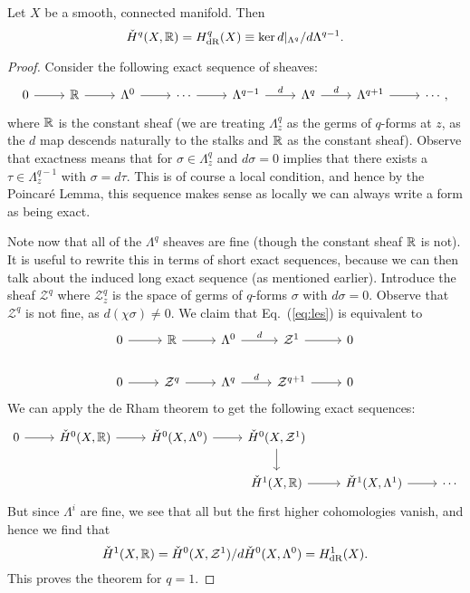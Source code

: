 \documentclass{../mathnotes}
\begin{document}
\begin{thm}[de Rham]
    Let $X$ be a smooth, connected manifold. Then
    \[\check H^q(X,\mathbb{R})=H_{\rm dR}^q(X)\equiv\ker d|_{\Lambda^q}/d\Lambda^{q-1}.\]
\end{thm}

\begin{proof}
    Consider the following exact sequence of sheaves:
    \begin{equation}
        \label{eq:les}
        \begin{tikzcd}
            0\arrow{r}&\R\arrow{r}&\Lambda^0\arrow{r}&\cdots\arrow{r}&\Lambda^{q-1}\arrow{r}{d}&\Lambda^q\arrow{r}{d}&\Lambda^{q+1}\arrow{r}&\cdots,
        \end{tikzcd}
    \end{equation}
    where $\mathbb{R}$ is the constant sheaf (we are treating $\Lambda_z^q$ as the germs of $q$-forms at $z$, as the $d$ map descends naturally
    to the stalks and $\mathbb{R}$ as the constant sheaf). Observe that exactness means that for $\sigma\in\Lambda_z^q$ and $d\sigma=0$
    implies that there exists a $\tau\in\Lambda_z^{q-1}$ with $\sigma=d\tau$. This is of course a local condition, and hence by
    the Poincar\'e Lemma, this sequence makes sense as locally we can always write a form as being exact.

    Note now that
    all of the $\Lambda^q$ sheaves are fine (though the constant sheaf $\mathbb{R}$ is not). It is useful to rewrite this in terms
    of short exact sequences, because we can then talk about the induced long exact sequence (as mentioned earlier).
    Introduce the sheaf $\mathcal{Z}^q$ where $\mathcal{Z}^q_z$ is the space of germs of $q$-forms $\sigma$ with $d\sigma=0$.
    Observe that $\mathcal{Z}^q$ is not fine, as $d(\chi\sigma)\neq 0$. We claim that Eq.~(\ref{eq:les}) is equivalent to
    \begin{equation}
        \begin{tikzcd}
            0\arrow{r}&\R\arrow{r}&\Lambda^0\arrow{r}{d}&\mathcal{Z}^1\arrow{r}&0\\
            0\arrow{r}&\mathcal{Z}^q\arrow{r}&\Lambda^q\arrow{r}{d}&\mathcal{Z}^{q+1}\arrow{r}&0
        \end{tikzcd}
        \label{eq:2ses}
    \end{equation}
    We can apply the de Rham theorem to get the following exact sequences:
    \begin{equation}
        \begin{tikzcd}
            0\arrow{r}&\check H^0(X,\R)\arrow{r}&\check H^0(X,\Lambda^0)\arrow{r}&\check H^0(X,\mathcal{Z}^1)\arrow{d}\\
            &&&\check H^1(X,\R)\arrow{r}&\check H^1(X,\Lambda^1)\arrow{r}&\cdots
        \end{tikzcd}
        \label{eq:les2}
    \end{equation}
    But since $\Lambda^i$ are fine, we see that all but the first higher cohomologies vanish,
    and hence we find that
    \[\check H^1(X,\mathbb{R})=\check H^0(X,\mathcal{Z}^1)/d\check H^0(X,\Lambda^0)=H^1_{\rm dR}(X).\]
    This proves the theorem for $q=1$.
    

\end{proof}
\end{document}
